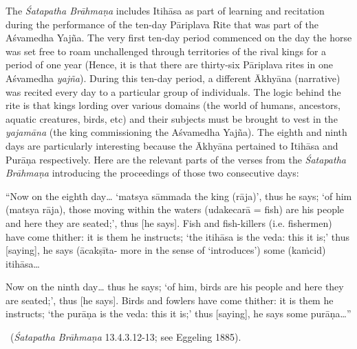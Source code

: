 The \textit{Śatapatha Brāhmaṇa} includes Itihāsa as part of learning and recitation during the performance of the ten-day Pāriplava Rite that was part of the Aśvamedha Yajña. The very first ten-day period commenced on the day the horse was set free to roam unchallenged through territories of the rival kings for a period of one year (Hence, it is that there are thirty-six Pāriplava rites in one Aśvamedha \textit{yajña}). During this ten-day period, a different Ākhyāna (narrative) was recited every day to a particular group of individuals. The logic behind the rite is that kings lording over various domains (the world of humans, ancestors, aquatic creatures, birds, etc) and their subjects must be brought to vest in the \textit{yajamāna} (the king commissioning the Aśvamedha Yajña). The eighth and ninth days are particularly interesting because the Ākhyāna pertained to Itihāsa and Purāṇa respectively. Here are the relevant parts of the verses from the \textit{Śatapatha Brāhmaṇa}  introducing the proceedings of those two consecutive days:

\begin{myquote}
“Now on the eighth day… ‘matsya sāmmada the king (rāja)’, thus he says; ‘of him (matsya rāja), those moving within the waters (udakecarā = fish) are his people and here they are seated;’, thus [he says]. Fish and fish-killers (i.e. fishermen) have come thither: it is them he instructs; ‘the itihāsa is the veda: this it is;’ thus [saying], he says (ācakṣīta- more in the sense of ‘introduces’) some (kaṁcid) itihāsa…
\end{myquote}

\begin{myquote}
Now on the ninth day… thus he says; ‘of him, birds are his people and here they are seated;’, thus [he says]. Birds and fowlers have come thither: it is them he instructs; ‘the purāṇa is the veda: this it is;’ thus [saying], he says some purāṇa…”

~\hfill (\textit{Śatapatha Brāhmaṇa} 13.4.3.12-13; see Eggeling 1885).
\end{myquote}

